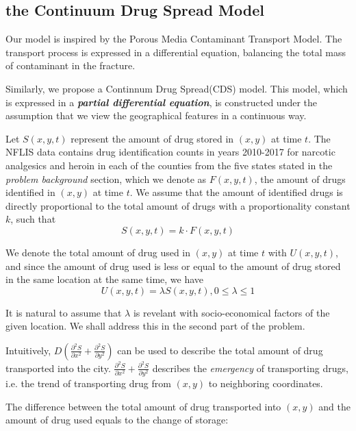 \subsection{the Continuum Drug Spread Model}
Our model is inspired by the Porous Media Contaminant Transport Model.\cite{8} The transport process is expressed in a differential equation, balancing the total mass of contaminant in the fracture. 

Similarly, we propose a Continnum Drug Spread(CDS) model. This model, which is expressed in a \textbf{\itshape partial differential equation}, is constructed under the assumption that we view the geographical features in a continuous way. 

Let $S(x,y,t)$ represent the amount of drug stored in $(x,y)$ at time $t$. The NFLIS data contains drug identification counts in years 2010-2017 for narcotic analgesics and heroin in each of the counties from the five states stated in the \textit{problem background} section, which we denote as $F(x,y,t)$, the amount of drugs identified in $(x,y)$ at time $t$. We assume that the amount of identified drugs is directly proportional to the total amount of drugs with a proportionality constant $k$, such that
\begin{equation}
S(x,y,t) = k\cdot F(x,y,t)
\end{equation}

We denote the total amount of drug used in $(x,y)$ at time $t$ with $U(x,y,t)$, and since the amount of drug used is less or equal to the amount of drug stored in the same location at the same time, we have
\begin{equation}
U(x,y,t) = \lambda S(x,y,t), 0\leq \lambda \leq 1
\end{equation}

It is natural to assume that $\lambda$ is revelant with socio-economical factors of the given location. We shall address this in the second part of the problem.

Intuitively, $D(\frac{\partial^2 S}{\partial x^2} + \frac{\partial^2 S}{\partial y^2})$ can be used to describe the total amount of drug transported into the city. $\frac{\partial^2 S}{\partial x^2} + \frac{\partial^2 S}{\partial y^2}$ describes the \textit{emergency} of transporting drugs, i.e. the trend of transporting drug from $(x,y)$ to neighboring coordinates.

The difference between the total amount of drug transported into $(x,y)$ and the amount of drug used equals to the change of storage:

